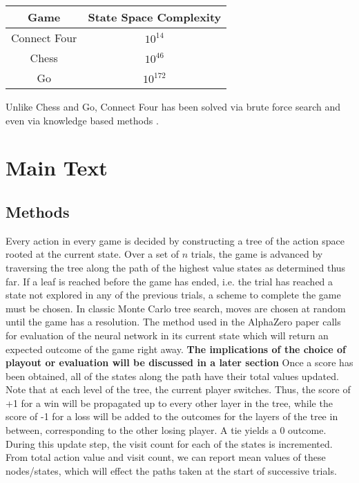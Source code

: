 \documentclass[twoside,11pt]{article}
\begin{document}
\begin{tabular}{ c c }
        Game & State Space Complexity \\
        \hline
        Connect Four & $10^{14}$ \\
        Chess & $10^{46}$ \\
        Go & $10^{172}$ \\
    \end{tabular}

Unlike Chess and Go, Connect Four has been solved via brute force search \cite{ConnectFourComputer} 
and even via knowledge based methods \cite{ConnectFourKnowledge}. 

\section{Main Text}


\subsection{Methods}

Every action in every game is decided by constructing a tree of the action space rooted at 
the current state. Over a set of
$n$ trials, the game is advanced by traversing the tree along the path of the highest
value states as determined thus far. If a leaf is reached before the game has ended, i.e. the trial
has reached a state not explored in any of the previous trials, a scheme to complete the game must be chosen.
In classic Monte Carlo tree search, moves are chosen at random until the game has a resolution. 
The method used in the AlphaZero paper calls for evaluation of the neural network in its current state
which will return an expected outcome of the game right away.
 \textbf{The implications of the choice of playout or evaluation
will be discussed in a later section}
Once a score has been obtained, all of the states along the path have their total values updated.
Note that at each level of the tree, the current player switches. Thus, the score of +1 for a win
will be propagated up to every other layer in the tree, while the score of -1 for a loss will be added
to the outcomes for the layers of the tree in between, corresponding to the other losing player. 
A tie yields a 0 outcome. During this  update step, the visit count for each of the states is incremented. 
From total action value and visit count, we can report 
mean values of these nodes/states, which will effect the paths taken at the start of successive trials.
\end{document}
